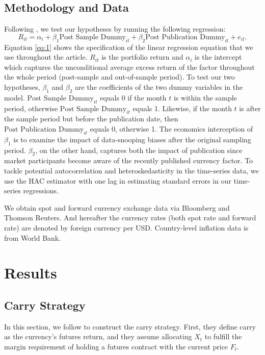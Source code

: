 \documentclass[12pt,a4paper]{article}
\begin{document}
\subsection{Methodology and Data}

Following \citet*{MP2016}, we test our hypotheses by running the following regression:
\begin{equation} \label{eq:1}
	R_{it} = \alpha_{i} + \beta_{1}\text{Post Sample Dummy}_{it} + \beta_{2}\text{Post Publication Dummy}_{it} + e_{it}.
\end{equation}
\noindent Equation \ref{eq:1} shows the specification of the linear regression equation that we use throughout the article.
$R_{it}$ is the portfolio return and $\alpha_{i}$ is the intercept which captures the unconditional average excess return 
of the factor throughout the whole period (post-sample and out-of-sample period).
To test our two hypotheses, $\beta_{1}$ and $\beta_{2}$ are the coefficients of the two dummy variables in the model.
$\text{Post Sample Dummy}_{it}$ equals 0 if the month $t$ is within the sample period,  
otherwise $\text{Post Sample Dummy}_{it}$ equals 1. Likewise, if the month $t$
is after the sample period but before the publication date, then $\text{Post Publication Dummy}_{it}$ equals 0, otherwise 1. 
The economics interception of $\beta_{1}$ is to examine the impact of data-snooping biases after the original sampling period. 
$\beta_{2}$, on the other hand, captures both the impact of publication since market participants become aware of the recently published currency factor. To tackle potential autocorrelation and heteroskedasticity in the time-series data, we use the \citet*{NW1987} HAC estimator with one lag in estimating standard errors in our time-series regressions.


We obtain spot and forward currency exchange data via Bloomberg and Thomson Reuters. 
And hereafter the currency rates (both spot rate and forward rate) 
are denoted by foreign currency per USD. Country-level inflation data is from World Bank. 


\section{Results}

\subsection{Carry Strategy}

In this section, we follow \citet*{KMMV2018} to construct the carry strategy.
First, they define carry as the currency's futures return, 
and they assume allocating $X_{t}$ to fulfill the margin requirement
of holding a futures contract with the current price $F_{t}$. 
\end{document}
